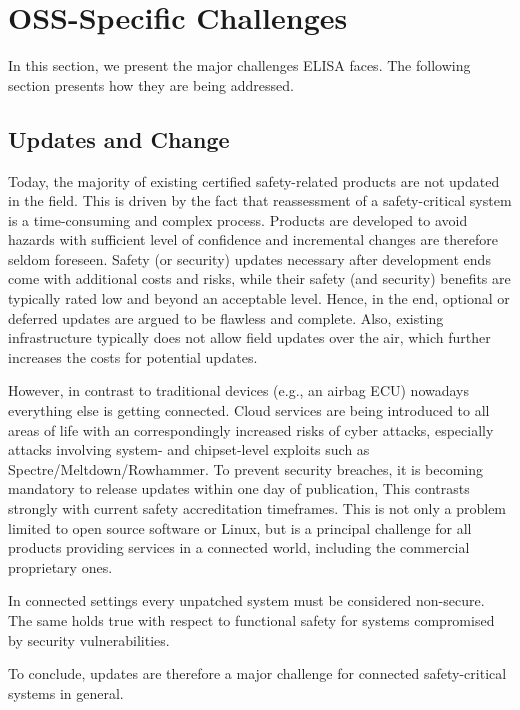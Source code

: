 \documentclass[12pt]{../Common_files/ElisaPaper}
\begin{document}
\section{OSS-Specific Challenges}
\label{sec:OSS specific Challenges}
In this section, we present the major challenges ELISA faces.
The following section presents how they are being addressed.

\subsection{Updates and Change}
\label{ssec:Updates and Change}
Today, the majority of existing certified safety-related products 
are not updated in the field.
This is driven by the fact 
that reassessment of a safety-critical system is a time-consuming and complex process.
Products are developed to avoid hazards with sufficient level of confidence and
incremental changes are therefore seldom foreseen.
Safety (or security) updates necessary after development ends come with additional costs and risks, 
while their safety (and security) benefits are typically rated low and beyond an acceptable level.
Hence, in the end, optional or deferred updates are argued to be flawless and complete.
Also, existing infrastructure typically does not allow field updates over the air, 
which further increases the costs for potential updates. 

However, in contrast to traditional devices 
(e.g., an airbag ECU) 
nowadays everything else is getting connected.
Cloud services are being introduced to all areas of life
with an correspondingly increased risks of cyber attacks,
especially attacks involving system- and chipset-level exploits 
such as  Spectre/Meltdown/Rowhammer. 
To prevent security breaches, it is becoming mandatory 
to release updates within one day of publication, 
This contrasts strongly with current safety accreditation timeframes.
This is not only a problem limited to open source software or Linux, 
but is a principal challenge for all products
providing services in a connected world,
including the commercial proprietary ones.

In connected settings every unpatched system must be considered non-secure. 
The same holds true with respect to functional safety 
for systems compromised by security vulnerabilities.

To conclude, updates are therefore a major challenge for connected safety-critical systems in general.
\end{document}
